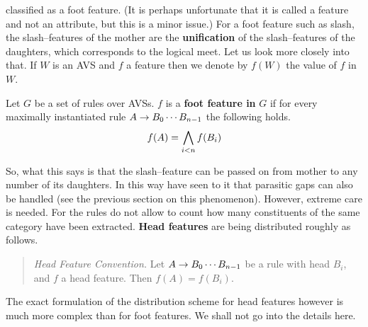 classified as a foot feature. (It is perhaps unfortunate that it
is called a feature and not an attribute, but this is a minor
issue.) For a foot feature such as {\sc slash}, the {\sc
slash}--features of the mother are the \textbf{unification} of 
the {\sc slash}--features of the daughters, which corresponds to the 
logical meet. 
Let us look more closely into that. If $W$ is 
an AVS and $f$ a feature then we denote by $f(W)$ the value 
of $f$ in $W$.
\begin{defn}
Let $G$ be a set of rules over AVSs. $f$ is a
\textbf{foot feature in} $G$ if for every maximally instantiated rule
$A \rightarrow B_0\dotsb B_{n-1}$ the following holds.
\begin{equation}
f(A) = \bigwedge_{i < n} f(B_i)
\end{equation}
\end{defn}
So, what this says is that the {\sc slash}--feature can be passed
on from mother to any number of its daughters. In this way 
\cite{gazdarpullumsag:gpsg} have seen to it that parasitic gaps 
can also be handled (see the previous section on this phenomenon). 
However, extreme care is needed. For the rules do not allow to count 
how many constituents of the same category have been extracted. 
\textbf{Head features} are being distributed roughly as follows.
\begin{quote}
{\sl Head Feature Convention.}
Let $A \rightarrow B_0 \dotsb B_{n-1}$ be a rule with head $B_i$, and
$f$ a head feature. Then $f(A) = f(B_i)$.
\end{quote}
The exact formulation of the distribution scheme for head features
however is much more complex than for foot features.  We shall not
go into the details here.

